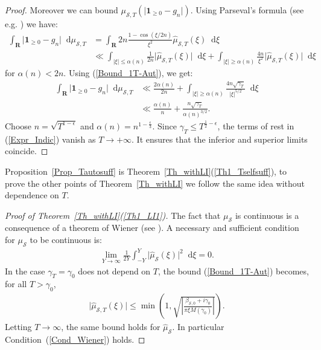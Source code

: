 \documentclass[a4paper,10pt]{amsart}
\theoremstyle{plain}
\theoremstyle{definition}
\begin{document}
\begin{proof}
Moreover we can bound $\mu_{\mathcal{S},T}(\lvert \mathbf{1}_{\geq 0} - g_{n}\rvert)$.
Using Parseval's formula (see e.g. \cite[Th. VI.2.2]{Katznelson}) we have:
\begin{align*}
\int_{\mathbf{R}}\lvert \mathbf{1}_{\geq 0} - g_{n}\rvert {\mathop{}\!\mathrm{d}}\mu_{\mathcal{S},T} &=
\int_{\mathbf{R}} 2n\frac{1-\cos(\xi/2n)}{\xi^{2}}\hat{\mu}_{\mathcal{S},T}(\xi){\mathop{}\!\mathrm{d}}\xi \\
&\ll \int_{\lvert\xi\rvert\leq \alpha(n)} \frac{1}{2n}\lvert\hat{\mu}_{\mathcal{S},T}(\xi)\rvert {\mathop{}\!\mathrm{d}}\xi    +     \int_{\lvert\xi\rvert\geq \alpha(n)} \frac{4n}{\xi^{2}}\lvert\hat{\mu}_{\mathcal{S},T}(\xi)\rvert {\mathop{}\!\mathrm{d}}\xi
\end{align*}
for $\alpha(n) <2n$.
Using (\ref{Bound_1T-Aut}), we get:
\begin{align*}
\int_{\mathbf{R}}\lvert \mathbf{1}_{\geq 0} - g_{n}\rvert {\mathop{}\!\mathrm{d}}\mu_{\mathcal{S},T} 
&\ll  \frac{2\alpha(n)}{2n}    +     \int_{\lvert\xi\rvert\geq \alpha(n)} \frac{4n\sqrt{\gamma_{T}}}{\lvert\xi\rvert^{5/2}} {\mathop{}\!\mathrm{d}}\xi \\
&\ll \frac{\alpha(n)}{n} + \frac{n\sqrt{\gamma_{T}}}{\alpha(n)^{3/2}}.
\end{align*}
Choose $n=\sqrt{T^{1-\epsilon}}$ and $\alpha(n) = n^{1-\frac{\epsilon}{3}}$.
Since $\gamma_{T} \leq T^{\frac{1}{2}-\epsilon}$, 
the terms of rest in (\ref{Expr_Indic}) vanish as $T\rightarrow+\infty$.
It ensures that the inferior and superior limits coincide.
\end{proof}

Proposition~\ref{Prop_Tautosuff} is Theorem~\ref{Th_withLI}(\ref{Th1_Tselfsuff}), 
to prove the other points of Theorem~\ref{Th_withLI} we follow the same idea without dependence on $T$.

\begin{proof}[Proof of Theorem~\ref{Th_withLI}(\ref{Th1_LI1})]
The fact that $\mu_{\mathcal{S}}$ is continuous is a consequence of a theorem of Wiener (see \cite[Th. VI.2.11]{Katznelson}).
A necessary and sufficient condition for $\mu_{\mathcal{S}}$ to be continuous is:
\begin{align}\label{Cond_Wiener}
\lim_{Y\rightarrow\infty}\frac{1}{2Y}\int_{-Y}^{Y}\lvert \hat{\mu}_{\mathcal{S}}(\xi)\rvert^{2}{\mathop{}\!\mathrm{d}}\xi =  0.
\end{align}
In the case $\gamma_{T}= \gamma_{0}$ does not depend on $T$, the bound (\ref{Bound_1T-Aut}) becomes, for all $T>\gamma_{0}$,
\begin{align*}
\lvert \hat{\mu}_{\mathcal{S},T}(\xi)\rvert 
\leq \min\left( 1, \sqrt{\left\lvert\frac{\beta_{\mathcal{S},0} + i\gamma_{0}}{ \pi\xi M(\gamma_{0})}\right\rvert}  \right).
\end{align*}
Letting $T\rightarrow\infty$, the same bound holds for $\hat{\mu}_{\mathcal{S}}$.
In particular Condition~(\ref{Cond_Wiener}) holds. 
\end{proof}
\end{document}
